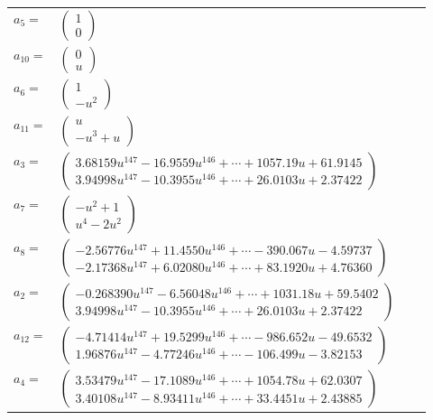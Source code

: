 \documentclass[1p]{elsarticle_modified}
\theoremstyle{definition}
\begin{document}
\begin{tabular}{m{7pt} m{180pt} m{7pt} m{180pt} }
\flushright $a_{5}=$&$\begin{pmatrix}1\\0\end{pmatrix}$ \\
\flushright $a_{10}=$&$\begin{pmatrix}0\\u\end{pmatrix}$ \\
\flushright $a_{6}=$&$\begin{pmatrix}1\\- u^2\end{pmatrix}$ \\
\flushright $a_{11}=$&$\begin{pmatrix}u\\- u^3+u\end{pmatrix}$ \\
\flushright $a_{3}=$&$\begin{pmatrix}3.68159 u^{147}-16.9559 u^{146}+\cdots+1057.19 u+61.9145\\3.94998 u^{147}-10.3955 u^{146}+\cdots+26.0103 u+2.37422\end{pmatrix}$ \\
\flushright $a_{7}=$&$\begin{pmatrix}- u^2+1\\u^4-2 u^2\end{pmatrix}$ \\
\flushright $a_{8}=$&$\begin{pmatrix}-2.56776 u^{147}+11.4550 u^{146}+\cdots-390.067 u-4.59737\\-2.17368 u^{147}+6.02080 u^{146}+\cdots+83.1920 u+4.76360\end{pmatrix}$ \\
\flushright $a_{2}=$&$\begin{pmatrix}-0.268390 u^{147}-6.56048 u^{146}+\cdots+1031.18 u+59.5402\\3.94998 u^{147}-10.3955 u^{146}+\cdots+26.0103 u+2.37422\end{pmatrix}$ \\
\flushright $a_{12}=$&$\begin{pmatrix}-4.71414 u^{147}+19.5299 u^{146}+\cdots-986.652 u-49.6532\\1.96876 u^{147}-4.77246 u^{146}+\cdots-106.499 u-3.82153\end{pmatrix}$ \\
\flushright $a_{4}=$&$\begin{pmatrix}3.53479 u^{147}-17.1089 u^{146}+\cdots+1054.78 u+62.0307\\3.40108 u^{147}-8.93411 u^{146}+\cdots+33.4451 u+2.43885\end{pmatrix}$ \\

\end{tabular}
\end{document}
